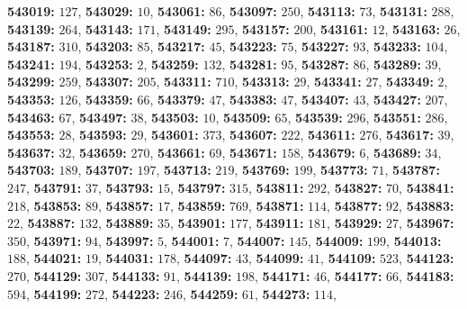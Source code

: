 \textsf{\bfseries 543019:} $127$, \textsf{\bfseries 543029:} $10$, \textsf{\bfseries 543061:} $86$, \textsf{\bfseries 543097:} $250$, \textsf{\bfseries 543113:} $73$, \textsf{\bfseries 543131:} $288$, \textsf{\bfseries 543139:} $264$, \textsf{\bfseries 543143:} $171$, \textsf{\bfseries 543149:} $295$, \textsf{\bfseries 543157:} $200$, \textsf{\bfseries 543161:} $12$, \textsf{\bfseries 543163:} $26$, \textsf{\bfseries 543187:} $310$, \textsf{\bfseries 543203:} $85$, \textsf{\bfseries 543217:} $45$, \textsf{\bfseries 543223:} $75$, \textsf{\bfseries 543227:} $93$, \textsf{\bfseries 543233:} $104$, \textsf{\bfseries 543241:} $194$, \textsf{\bfseries 543253:} $2$, \textsf{\bfseries 543259:} $132$, \textsf{\bfseries 543281:} $95$, \textsf{\bfseries 543287:} $86$, \textsf{\bfseries 543289:} $39$, \textsf{\bfseries 543299:} $259$, \textsf{\bfseries 543307:} $205$, \textsf{\bfseries 543311:} $710$, \textsf{\bfseries 543313:} $29$, \textsf{\bfseries 543341:} $27$, \textsf{\bfseries 543349:} $2$, \textsf{\bfseries 543353:} $126$, \textsf{\bfseries 543359:} $66$, \textsf{\bfseries 543379:} $47$, \textsf{\bfseries 543383:} $47$, \textsf{\bfseries 543407:} $43$, \textsf{\bfseries 543427:} $207$, \textsf{\bfseries 543463:} $67$, \textsf{\bfseries 543497:} $38$, \textsf{\bfseries 543503:} $10$, \textsf{\bfseries 543509:} $65$, \textsf{\bfseries 543539:} $296$, \textsf{\bfseries 543551:} $286$, \textsf{\bfseries 543553:} $28$, \textsf{\bfseries 543593:} $29$, \textsf{\bfseries 543601:} $373$, \textsf{\bfseries 543607:} $222$, \textsf{\bfseries 543611:} $276$, \textsf{\bfseries 543617:} $39$, \textsf{\bfseries 543637:} $32$, \textsf{\bfseries 543659:} $270$, \textsf{\bfseries 543661:} $69$, \textsf{\bfseries 543671:} $158$, \textsf{\bfseries 543679:} $6$, \textsf{\bfseries 543689:} $34$, \textsf{\bfseries 543703:} $189$, \textsf{\bfseries 543707:} $197$, \textsf{\bfseries 543713:} $219$, \textsf{\bfseries 543769:} $199$, \textsf{\bfseries 543773:} $71$, \textsf{\bfseries 543787:} $247$, \textsf{\bfseries 543791:} $37$, \textsf{\bfseries 543793:} $15$, \textsf{\bfseries 543797:} $315$, \textsf{\bfseries 543811:} $292$, \textsf{\bfseries 543827:} $70$, \textsf{\bfseries 543841:} $218$, \textsf{\bfseries 543853:} $89$, \textsf{\bfseries 543857:} $17$, \textsf{\bfseries 543859:} $769$, \textsf{\bfseries 543871:} $114$, \textsf{\bfseries 543877:} $92$, \textsf{\bfseries 543883:} $22$, \textsf{\bfseries 543887:} $132$, \textsf{\bfseries 543889:} $35$, \textsf{\bfseries 543901:} $177$, \textsf{\bfseries 543911:} $181$, \textsf{\bfseries 543929:} $27$, \textsf{\bfseries 543967:} $350$, \textsf{\bfseries 543971:} $94$, \textsf{\bfseries 543997:} $5$, \textsf{\bfseries 544001:} $7$, \textsf{\bfseries 544007:} $145$, \textsf{\bfseries 544009:} $199$, \textsf{\bfseries 544013:} $188$, \textsf{\bfseries 544021:} $19$, \textsf{\bfseries 544031:} $178$, \textsf{\bfseries 544097:} $43$, \textsf{\bfseries 544099:} $41$, \textsf{\bfseries 544109:} $523$, \textsf{\bfseries 544123:} $270$, \textsf{\bfseries 544129:} $307$, \textsf{\bfseries 544133:} $91$, \textsf{\bfseries 544139:} $198$, \textsf{\bfseries 544171:} $46$, \textsf{\bfseries 544177:} $66$, \textsf{\bfseries 544183:} $594$, \textsf{\bfseries 544199:} $272$, \textsf{\bfseries 544223:} $246$, \textsf{\bfseries 544259:} $61$, \textsf{\bfseries 544273:} $114$, 
